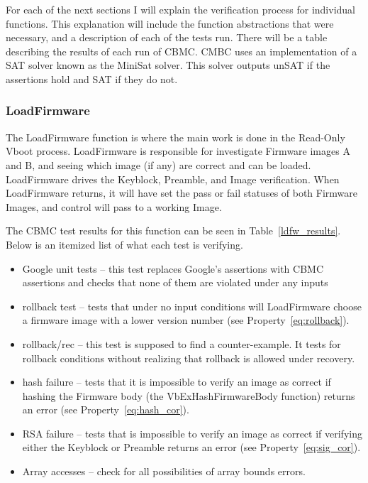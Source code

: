 \documentclass[../report.tex]{subfiles}
\begin{document}
For each of the next sections I will explain the verification process for individual functions. 
This explanation will include the function abstractions that were necessary, and a description of each of the tests run. 
There will be a table describing the results of each run of CBMC\@.
CMBC uses an implementation of a SAT solver known as the MiniSat solver\cite{minisat}.
This solver outputs unSAT if the assertions hold and SAT if they do not. 

\subsubsection{LoadFirmware}

The LoadFirmware function is where the main work is done in the Read-Only Vboot process.
LoadFirmware is responsible for investigate Firmware images A and B, and seeing which image (if any) are correct and can be loaded.
LoadFirmware drives the  Keyblock, Preamble, and Image verification.
When LoadFirmware returns, it will have set the pass or fail statuses of both Firmware Images, and control will pass to a working Image.

The CBMC test results for this function can be seen in Table~\ref{ldfw_results}. 
Below is an itemized list of what each test is verifying.
\begin{itemize}
 \item  Google unit tests -- this test replaces Google's assertions with CBMC assertions and checks that none of them are violated under any inputs
 \item  rollback test -- tests that under no input conditions will LoadFirmware choose a firmware image with a lower version number (see Property~\ref{eq:rollback}).
 \item  rollback/rec  -- this test is supposed to find a counter-example. It tests for rollback conditions without realizing that rollback is allowed under recovery. 
 \item  hash failure -- tests that it is impossible to verify an image as correct  if hashing the Firmware body (the VbExHashFirmwareBody function) returns an error (see Property~\ref{eq:hash_cor}).
 \item  RSA failure -- tests that is impossible to verify an image as correct if verifying either the Keyblock or Preamble returns an error (see Property~\ref{eq:sig_cor}).
 \item  Array accesses -- check for all possibilities of array bounds errors.
\end{itemize}
\end{document}
